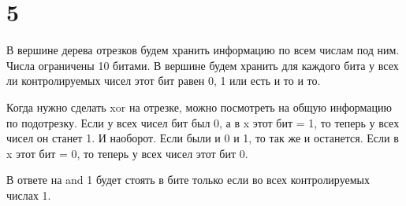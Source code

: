 \documentclass[12pt]{extarticle}
\begin{document}
\section*{5}
В вершине дерева отрезков будем хранить информацию по всем числам под ним. Числа ограничены 10 битами. В вершине будем хранить для каждого бита у всех ли контролируемых чисел этот бит равен 0, 1 или есть и то и то. 

Когда нужно сделать xor на отрезке, можно посмотреть на общую информацию по подотрезку. Если у всех чисел бит был 0, а в x этот бит = 1, то теперь у всех чисел он станет 1. И наоборот. Если были и 0 и 1, то так же и останется. Если в x этот бит = 0, то теперь у всех чисел этот бит 0.

В ответе на and 1 будет стоять в бите только если во всех контролируемых числах 1.
\end{document}
